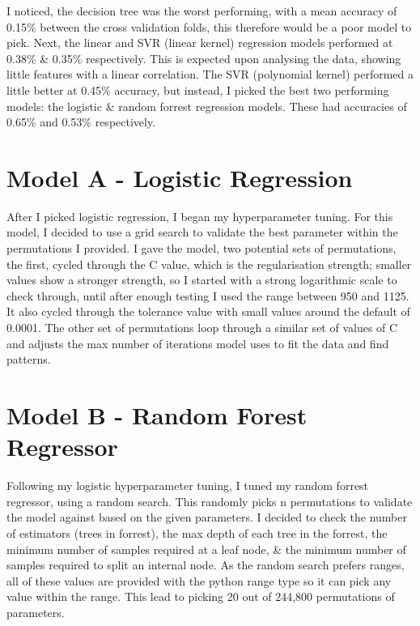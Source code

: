 \documentclass[11pt, a4paper, twocolumn]{article}
\begin{document}
I noticed, the decision tree was the worst performing, with a mean accuracy of 0.15\% between the cross validation folds, this therefore would be a poor model to pick. Next, the linear and SVR (linear kernel) regression models performed at 0.38\% \& 0.35\% respectively. This is expected upon analysing the data, showing little features with a linear correlation.
The SVR (polynomial kernel) performed a little better at 0.45\% accuracy, but instead, I picked the best two performing models: the logistic \& random forrest regression models. These had accuracies of 0.65\% and 0.53\% respectively. 



\section{Model A - Logistic Regression}

After I picked logistic regression, I began my hyperparameter tuning. For this model, I decided to use a grid search to validate the best parameter within the permutations I provided. 
I gave the model, two potential sets of permutations, the first, cycled through the C value, which is the regularisation strength; smaller values show a stronger strength, 
so I started with a strong logarithmic scale to check through, until after enough testing I used the range between 950 and 1125. It also cycled through the tolerance value with small values around the default of 0.0001.
The other set of permutations loop through a similar set of values of C and adjusts the max number of iterations model uses to fit the data and find patterns.

\section{Model B - Random Forest Regressor}

Following my logistic hyperparameter tuning, I tuned my random forrest regressor, using a random search. This randomly picks n permutations to validate the model against based on the given parameters.
I decided to check the number of estimators (trees in forrest), the max depth of each tree in the forrest, the minimum number of samples required at a leaf node, \& the minimum number of samples required to split an internal node.
As the random search prefers ranges, all of these values are provided with the python range type so it can pick any value within the range. This lead to picking 20 out of 244,800 permutations of parameters.
\end{document}
